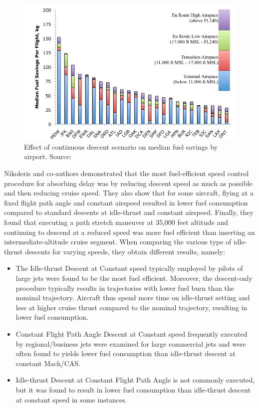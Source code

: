 \documentclass{aer1315-pretty}
\begin{document}
\begin{figure}[!h]
\centering
\includegraphics[height=0.4\textwidth]{figures/Comparison.jpg}
	\caption{Effect of continuous descent scenario on median fuel savings by airport. Source: \cite{Rob:2010}}	
	\label{fig:Compare}
\end{figure}

Nikoleris and co-authors \cite{Niko:2012} demonstrated that the most fuel-efficient speed control procedure for absorbing delay was by reducing descent speed as much as possible and then reducing cruise speed. They also show that for some aircraft, flying at a fixed flight path angle and constant airspeed resulted in lower fuel consumption compared to standard descents at idle-thrust and constant airspeed. Finally, they found that executing a path stretch maneuver at 35,000 feet altitude and continuing to descend at a reduced speed was more fuel efficient than inserting an intermediate-altitude cruise segment. When comparing the various type of idle-thrust descents for varying speeds, they obtain different results, namely:
\begin{itemize}
\item The  Idle-thrust Descent at Constant speed typically employed by pilots of large jets were found to be the most fuel efficient. Moreover, the descent-only procedure typically results in trajectories with lower fuel burn than the nominal trajectory. Aircraft thus spend more time on idle-thrust setting and less at higher cruise thrust compared to the nominal trajectory, resulting in lower fuel consumption. 
\item Constant Flight Path Angle Descent at Constant speed frequently executed by regional/business jets were examined for large commercial jets and were often found to yields lower fuel consumption than idle-thrust descent at constant Mach/CAS.
\item Idle-thrust Descent at Constant Flight Path Angle is not commonly executed, but it was found to result in lower fuel consumption than idle-thrust descent at constant speed in some instances. \par
\end{itemize}
\end{document}
